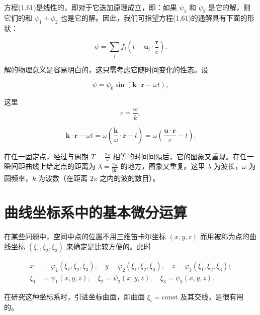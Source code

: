 \documentclass[11pt,a4paper,oneside]{ctexbook}
\newcommand{\ve}[1]{\bm{#1}}
\begin{document}
方程(1.61)是线性的，即对于它迭加原理成立，即：如果 $\psi_1$ 和 $\psi_2$ 是它的解，则它们的和 $\psi_1 + \psi_2$ 也是它的解。因此，我们可指望方程(1.61)的通解具有下面的形状：

\begin{equation*}
\psi = \sum_{i} f_i \left(t - \ve{u}_i \cdot \frac{\ve{r}}{c}\right).
\end{equation*}

解的物理意义是容易明白的，这只需考虑它随时间变化的性态。设

\begin{equation*}
\psi = \psi_0 \sin(\ve{k} \cdot \ve{r} - \omega t),
\end{equation*}

这里
\begin{equation*}
c = \frac{\omega}{k},
\end{equation*}

\begin{equation*}
\ve{k} \cdot \ve{r} - \omega t = \omega \left(\frac{\ve{k}}{\omega} \cdot \ve{r} - t\right) = \omega \left(\frac{\ve{u} \cdot \ve{r}}{c} - t\right).
\end{equation*}

在任一固定点，经过与周期 $T = \frac{2\pi}{\omega}$ 相等的时间间隔后，它的图象又重现。在任一瞬间距曲线上给定点的距离为 $\lambda = \frac{2\pi}{|\ve{k}|}$ 的地方，图象又重复。这里 $\lambda$ 为波长，$\omega$ 为圆频率，$k$ 为波数（在距离 $2\pi$ 之内的波的数目）。

\section{曲线坐标系中的基本微分运算}

在某些问题中，空间中点的位置不用三维笛卡尔坐标 $(x, y, z)$ 而用被称为点的曲线坐标 $(\xi_1, \xi_2, \xi_3)$ 来确定是比较方便的。此时

\begin{equation*}
\begin{aligned}
x &= \varphi_1(\xi_1, \xi_2, \xi_3), \quad y = \varphi_2(\xi_1, \xi_2, \xi_3), \quad z = \varphi_3(\xi_1, \xi_2, \xi_3);\\
\xi_1 &= \psi_1(x, y, z), \quad \xi_2 = \psi_2(x, y, z), \quad \xi_3 = \psi_3(x, y, z).
\end{aligned}
\end{equation*}

在研究这种坐标系时，引进坐标曲面，即曲面 $\xi_i = \text{const}$ 及其交线，是很有用的。
\end{document}
